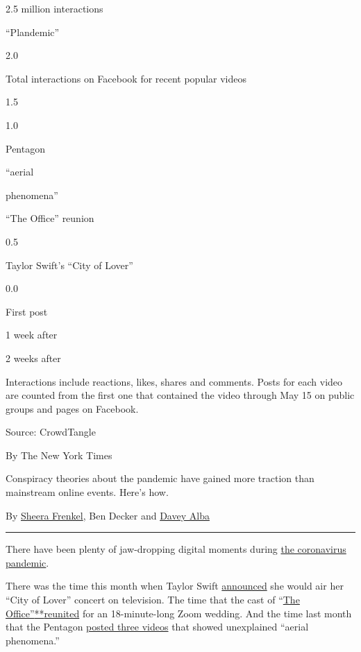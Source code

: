 2.5 million interactions

``Plandemic''

2.0

Total interactions on Facebook for recent popular videos

1.5

1.0

Pentagon

``aerial

phenomena''

``The Office'' reunion

0.5

Taylor Swift's ``City of Lover''

0.0

First post

1 week after

2 weeks after

Interactions include reactions, likes, shares and comments. Posts for
each video are counted from the first one that contained the video
through May 15 on public groups and pages on Facebook.

Source: CrowdTangle

By The New York Times

Conspiracy theories about the pandemic have gained more traction than
mainstream online events. Here's how.

By \href{https://www.nytimes3xbfgragh.onion/by/sheera-frenkel}{Sheera
Frenkel}, Ben Decker and
\href{https://www.nytimes3xbfgragh.onion/by/davey-alba}{Davey Alba}

\begin{center}\rule{0.5\linewidth}{\linethickness}\end{center}

There have been plenty of jaw-dropping digital moments during
\href{https://www.nytimes3xbfgragh.onion/news-event/coronavirus?action=click\&pgtype=Article\&state=default\&module=styln-coronavirus\&variant=show\&region=TOP_BANNER\&context=storylines_menu}{the
coronavirus pandemic}.

There was the time this month when Taylor Swift
\href{https://variety.com/2020/music/news/taylor-swift-city-lover-concert-paris-abc-special-1234601657/}{announced}
she would air her ``City of Lover'' concert on television. The time that
the cast of ``\href{https://www.youtube.com/watch?v=NDjNX3nEfYo}{The
Office''}\href{https://www.youtube.com/watch?v=NDjNX3nEfYo}{**}\href{https://www.youtube.com/watch?v=NDjNX3nEfYo}{reunited}
for an 18-minute-long Zoom wedding. And the time last month that the
Pentagon
\href{https://www.defense.gov/Newsroom/Releases/Release/Article/2165713/statement-by-the-department-of-defense-on-the-release-of-historical-navy-videos/}{posted
three videos} that showed unexplained ``aerial phenomena.''

